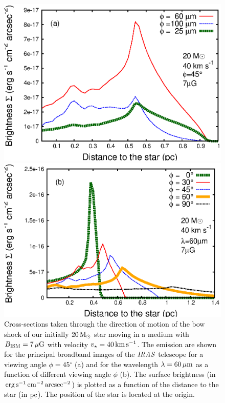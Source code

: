 \documentclass[useAMS,usenatbib]{mn2e}
\newcommand{\degree}{\ensuremath{^\circ}}
\begin{document}
\begin{figure}
	\begin{minipage}[b]{ 0.48\textwidth}
		\includegraphics[width=1.0\textwidth]{./plot_wavelengths.eps}
	\end{minipage} 
	\begin{minipage}[b]{ 0.48\textwidth}
		\includegraphics[width=1.0\textwidth]{./plot_angles.eps}
	\end{minipage}  	
	\caption{
		\textcolor{black}{Cross-sections taken through the direction of motion of the bow shock 
of our initially $20\, \rm M_{\odot}$ star moving in a medium with $B_{\rm ISM}=7\, \mu\rm G$ 
with velocity $v_{\star}=40\, \rm km\, \rm s^{-1}$. The emission are shown for the principal 
broadband images of the $\it IRAS$ telescope for a viewing angle $\phi=45\degree$ (a) and for 
the wavelength $\lambda=60\, \mu\rm m$ as a function of different viewing angle $\phi$ (b).  
The surface brightness (in $\rm erg\, \rm s^{-1}\, \rm cm^{-2}\, \rm arcsec^{-2}$) is plotted as a 
function of the distance to the star (in $\rm pc$). The position of the star is located at the origin.} 
		 }
	\label{fig:cuts}  
\end{figure}
\end{document}
